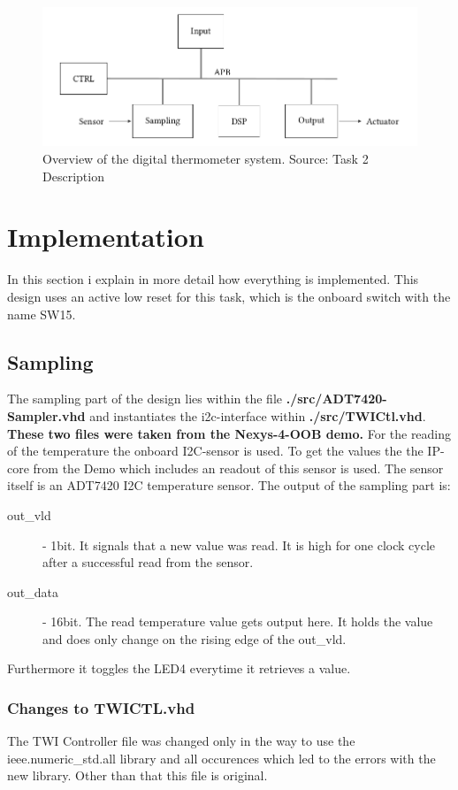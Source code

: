 \documentclass[%
	a4paper,
]
{article}
\begin{document}
\begin{figure}[H]
		\centering
		\includegraphics[width=0.8\linewidth]{fig/system}
		\caption{Overview of the digital thermometer system. Source: Task 2 Description}
		\label{fig:system}
\end{figure}


\section {Implementation}
In this section i explain in more detail how everything is implemented. This design uses
 an active low reset for this task, which is the onboard switch with the name SW15.

\subsection{Sampling}
The sampling part of the design lies within the file \textbf{./src/ADT7420-Sampler.vhd} 
and instantiates the i2c-interface within \textbf{./src/TWICtl.vhd}.
\textbf{These two files were taken from the Nexys-4-OOB demo.}
For the reading of the temperature the onboard I2C-sensor is used. To get the values the
 the IP-core from the \autocite{Nexys-4-OOB} Demo which includes an readout of this sensor
 is used.
The sensor itself is an ADT7420 I2C temperature sensor. 
The output of the sampling part is:
\begin{description}
\item[out\_vld] - 1bit. It signals that a new value was read. It is high for one clock cycle after a 
successful read from the sensor.
\item[out\_data] - 16bit. The read temperature value gets output here. It holds the value and does
only change on the rising edge of the out\_vld.
\end{description}
Furthermore it toggles the LED4 everytime it retrieves a value.

\subsubsection{Changes to TWICTL.vhd}
The TWI Controller file was changed only in the way to use the ieee.numeric\_std.all library and 
all occurences which led to the errors with the new library.
Other than that this file is original.
\end{document}
